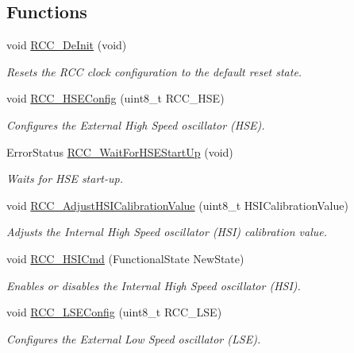 \subsection*{Functions}
\begin{DoxyCompactItemize}
\item 
void \hyperlink{group___r_c_c___group1_ga413f6422be11b1334abe60b3bff2e062}{R\+C\+C\+\_\+\+De\+Init} (void)
\begin{DoxyCompactList}\small\item\em Resets the R\+CC clock configuration to the default reset state. \end{DoxyCompactList}\item 
void \hyperlink{group___r_c_c___group1_ga523b06e73f6aa8a03e42299c855066a8}{R\+C\+C\+\_\+\+H\+S\+E\+Config} (uint8\+\_\+t R\+C\+C\+\_\+\+H\+SE)
\begin{DoxyCompactList}\small\item\em Configures the External High Speed oscillator (H\+SE). \end{DoxyCompactList}\item 
Error\+Status \hyperlink{group___r_c_c___group1_gae0f15692614dd048ee4110a056f001dc}{R\+C\+C\+\_\+\+Wait\+For\+H\+S\+E\+Start\+Up} (void)
\begin{DoxyCompactList}\small\item\em Waits for H\+SE start-\/up. \end{DoxyCompactList}\item 
void \hyperlink{group___r_c_c___group1_gaa2d6a35f5c2e0f86317c3beb222677fc}{R\+C\+C\+\_\+\+Adjust\+H\+S\+I\+Calibration\+Value} (uint8\+\_\+t H\+S\+I\+Calibration\+Value)
\begin{DoxyCompactList}\small\item\em Adjusts the Internal High Speed oscillator (H\+SI) calibration value. \end{DoxyCompactList}\item 
void \hyperlink{group___r_c_c___group1_ga0c6772a1e43765909495f57815ef69e2}{R\+C\+C\+\_\+\+H\+S\+I\+Cmd} (Functional\+State New\+State)
\begin{DoxyCompactList}\small\item\em Enables or disables the Internal High Speed oscillator (H\+SI). \end{DoxyCompactList}\item 
void \hyperlink{group___r_c_c___group1_ga65209ab5c3589b249c7d70f978735ca6}{R\+C\+C\+\_\+\+L\+S\+E\+Config} (uint8\+\_\+t R\+C\+C\+\_\+\+L\+SE)
\begin{DoxyCompactList}\small\item\em Configures the External Low Speed oscillator (L\+SE). \end{DoxyCompactList}\item 

\end{DoxyCompactItemize}
